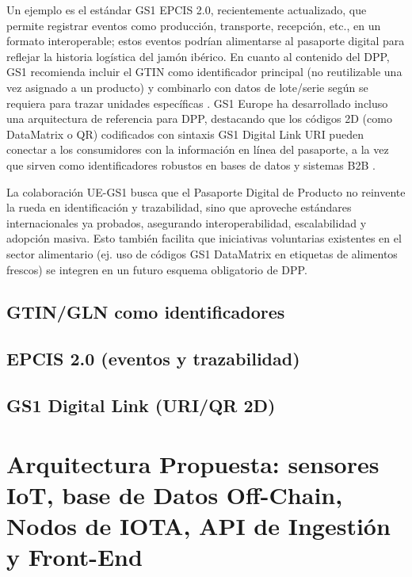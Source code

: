 Un ejemplo es el estándar GS1 EPCIS 2.0, recientemente actualizado, que permite registrar eventos como producción, transporte, recepción, etc., en un formato interoperable; estos eventos podrían alimentarse al pasaporte digital para reflejar la historia logística del jamón ibérico. En cuanto al contenido del DPP, GS1 recomienda incluir el GTIN como identificador principal (no reutilizable una vez asignado a un producto) y combinarlo con datos de lote/serie según se requiera para trazar unidades específicas \cite{gs1_in_europe_gs1-standards-enabling-dpp_2024}. GS1 Europe ha desarrollado incluso una arquitectura de referencia para DPP, destacando que los códigos 2D (como DataMatrix o QR) codificados con sintaxis GS1 Digital Link URI pueden conectar a los consumidores con la información en línea del pasaporte, a la vez que sirven como identificadores robustos en bases de datos y sistemas B2B \cite{gs1_in_europe_gs1-standards-enabling-dpp_2024}.

La colaboración UE-GS1 busca que el Pasaporte Digital de Producto no reinvente la rueda en identificación y trazabilidad, sino que aproveche estándares internacionales ya probados, asegurando interoperabilidad, escalabilidad y adopción masiva. Esto también facilita que iniciativas voluntarias existentes en el sector alimentario (ej. uso de códigos GS1 DataMatrix en etiquetas de alimentos frescos) se integren en un futuro esquema obligatorio de DPP.

\subsection{GTIN/GLN como identificadores}
\subsection{EPCIS 2.0 (eventos y trazabilidad)}
\subsection{GS1 Digital Link (URI/QR 2D)}

\section{Arquitectura Propuesta: sensores IoT, base de Datos Off-Chain, Nodos de IOTA, API de Ingestión y Front-End}\label{sec:diseño-arquitectura}
